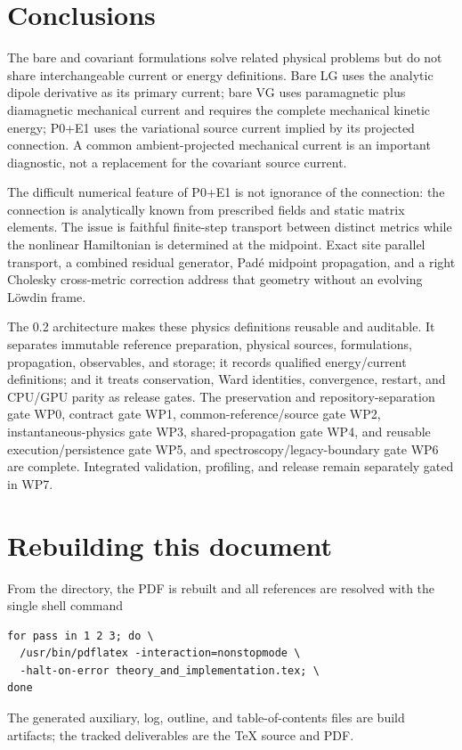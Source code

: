 \documentclass[11pt]{article}
\begin{document}
\section{Conclusions}

The bare and covariant formulations solve related physical problems but do
not share interchangeable current or energy definitions. Bare LG uses the
analytic dipole derivative as its primary current; bare VG uses paramagnetic
plus diamagnetic mechanical current and requires the complete mechanical
kinetic energy; P0+E1 uses the variational source current implied by its
projected connection. A common ambient-projected mechanical current is an
important diagnostic, not a replacement for the covariant source current.

The difficult numerical feature of P0+E1 is not ignorance of the connection:
the connection is analytically known from prescribed fields and static matrix
elements. The issue is faithful finite-step transport between distinct
metrics while the nonlinear Hamiltonian is determined at the midpoint. Exact
site parallel transport, a combined residual generator, Pad\'e midpoint
propagation, and a right Cholesky cross-metric correction address that geometry
without an evolving L\"owdin frame.

The 0.2 architecture makes these physics definitions reusable and
auditable. It separates immutable reference preparation, physical sources,
formulations, propagation, observables, and storage; it records qualified
energy/current definitions; and it treats conservation, Ward identities,
convergence, restart, and CPU/GPU parity as release gates. The preservation and
repository-separation gate WP0, contract gate WP1, common-reference/source gate
WP2, instantaneous-physics gate WP3, shared-propagation gate WP4, and reusable
execution/persistence gate WP5, and spectroscopy/legacy-boundary gate WP6 are
complete. Integrated validation, profiling, and release remain separately
gated in WP7.

\section*{Rebuilding this document}

From the  directory, the PDF is rebuilt and all references are
resolved with the single shell command
\begin{verbatim}
for pass in 1 2 3; do \
  /usr/bin/pdflatex -interaction=nonstopmode \
  -halt-on-error theory_and_implementation.tex; \
done
\end{verbatim}
The generated auxiliary, log, outline, and table-of-contents files are build
artifacts; the tracked deliverables are the TeX source and PDF.
\end{document}
